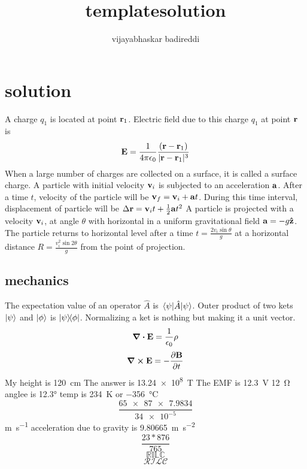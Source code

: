 \documentclass[12pt] {article}
\title{templatesolution}
\author{vijayabhaskar badireddi}
\begin{document}
\section*{solution}
A charge $q_1$ is located at point $\vb{r}_1$.
Electric field due to this charge $q_1$ at point $\vb{r}$ is
\[\vb{E}=\frac{1}{4\pi\epsilon_0}\frac{(\vb{r}-\vb{r}_1)}{|\vb{r}-\vb{r}_1|^3}\]
When a large number of charges are collected on a surface, it is called a surface charge.
A particle with initial velocity $\vb{v}_i$ is subjected to an acceleration $\vb{a}$.
After a time $t$, velocity of the particle will be $\vb{v}_f=\vb{v}_i+\vb{a}t$.
During this time interval, displacement of particle will be $\Delta{\vb{r}}=\vb{v}_it+\frac{1}{2}\vb{a}t^2$
A particle is projected with a velocity $\vb{v}_i$, at angle $\theta$ with
 horizontal in a uniform gravitational field $\vb{a}=-g\vu{z}$. The particle returns to 
 horizontal level after a time $t=\frac{2v_i\sin\theta}{g}$ at a horizontal distance
  $R=\frac{v_i^2\sin2\theta}{g}$ from the point of projection.
\subsection*{mechanics}
The expectation value of an operator $\hat{A}$ is $\expval{\hat{A}}{\psi}$. Outer product 
of two kets $\ket{\psi}$ and $\ket{\phi}$ is $\op{\psi}{\phi}$.
Normalizing a ket is nothing but making it a unit vector.
\[\div{\vb{E}}=\frac{1}{\epsilon_0}\rho\]
\[\curl{\vb{E}}=-\pdv{\vb{B}}{t}\]
My height is \SI{120}{\centi\metre}
The answer is \SI{13.24e8}{\tesla}
The EMF is \SI{12.3}{\volt}
\SI{12}{\ohm}\\
anglee is \ang{12.3}
temp is \SI{234}{\kelvin} or \SI{-356}{\celsius}
\[\frac{\num{65 x 87 x 7.9834}}{\num{34e-5}}\]
\si{\meter\per\second}
acceleration due to gravity is \SI{9.80665}{\meter\per\square\second}
\[\frac{23*876}{765}\]
\[\mathbb{RILC}\]
\[\mathcal{RILC}\]
\end{document}
